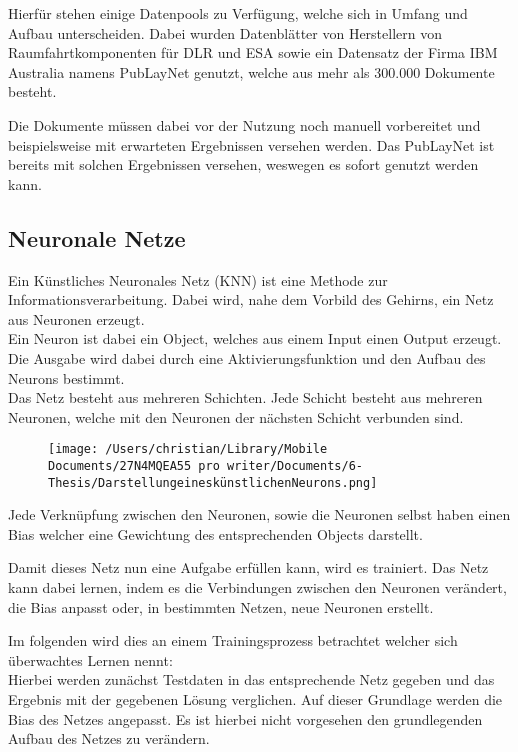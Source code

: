 \documentclass[
]{article}
\begin{document}
Hierfür stehen einige Datenpools zu Verfügung, welche sich in Umfang und
Aufbau unterscheiden. Dabei wurden Datenblätter von Herstellern von
Raumfahrtkomponenten für DLR und ESA sowie ein Datensatz der Firma IBM
Australia namens PubLayNet genutzt, welche aus mehr als 300.000
Dokumente besteht.

Die Dokumente müssen dabei vor der Nutzung noch manuell vorbereitet und
beispielsweise mit erwarteten Ergebnissen versehen werden. Das PubLayNet
ist bereits mit solchen Ergebnissen versehen, weswegen es sofort genutzt
werden kann.

\hypertarget{header-n35}{%
\subsection{Neuronale Netze}\label{header-n35}}

Ein Künstliches Neuronales Netz (KNN) ist eine Methode zur
Informationsverarbeitung. Dabei wird, nahe dem Vorbild des Gehirns, ein
Netz aus Neuronen erzeugt.\\
Ein Neuron ist dabei ein Object, welches aus einem Input einen Output
erzeugt. Die Ausgabe wird dabei durch eine Aktivierungsfunktion und den
Aufbau des Neurons bestimmt.\\
Das Netz besteht aus mehreren Schichten. Jede Schicht besteht aus
mehreren Neuronen, welche mit den Neuronen der nächsten Schicht
verbunden sind.

\begin{figure}
\centering
\texttt{[image: /Users/christian/Library/Mobile Documents/27N4MQEA55~pro~writer/Documents/6-Thesis/DarstellungeineskünstlichenNeurons.png]}
\caption{}
\end{figure}

Jede Verknüpfung zwischen den Neuronen, sowie die Neuronen selbst haben
einen Bias welcher eine Gewichtung des entsprechenden Objects darstellt.

Damit dieses Netz nun eine Aufgabe erfüllen kann, wird es trainiert. Das
Netz kann dabei lernen, indem es die Verbindungen zwischen den Neuronen
verändert, die Bias anpasst oder, in bestimmten Netzen, neue Neuronen
erstellt.

Im folgenden wird dies an einem Trainingsprozess betrachtet welcher sich
überwachtes Lernen nennt:\\
Hierbei werden zunächst Testdaten in das entsprechende Netz gegeben und
das Ergebnis mit der gegebenen Lösung verglichen. Auf dieser Grundlage
werden die Bias des Netzes angepasst. Es ist hierbei nicht vorgesehen
den grundlegenden Aufbau des Netzes zu verändern.
\end{document}
